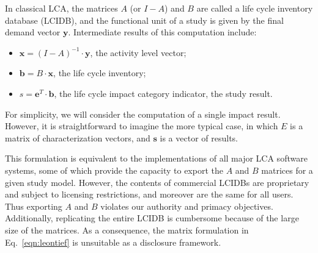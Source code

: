 In classical LCA, the matrices $A$ (or $I-A$) and $B$ are called a life cycle inventory database (LCIDB), and the functional unit of a study is given by the final demand vector $\mathbf{y}$.  Intermediate results of this computation include:
\begin{itemize}
\item $\mathbf{x} = \left(I-A\right)^{-1}\cdot\mathbf{y}$, the activity level vector;
\item $\mathbf{b} = B\cdot\mathbf{x}$, the life cycle inventory;
\item $s = \mathbf{e}^T\cdot\mathbf{b}$, the life cycle impact category indicator, the study result.
\end{itemize}
For simplicity, we will consider the computation of a single impact result.  However, it is straightforward to imagine the more typical case, in which $E$ is a matrix of characterization vectors, and $\mathbf{s}$ is a vector of results.

This formulation is equivalent to the implementations of all major LCA software systems, some of which provide the capacity to export the $A$ and $B$ matrices for a given study model.  However, the contents of commercial LCIDBs are proprietary and subject to licensing restrictions, and moreover are the same for all users.  Thus exporting $A$ and $B$ violates our authority and primacy objectives.  Additionally, replicating the entire LCIDB is cumbersome because of the large size of the matrices.   As a consequence, the matrix formulation in Eq.~\ref{eqn:leontief} is unsuitable as a disclosure framework.

